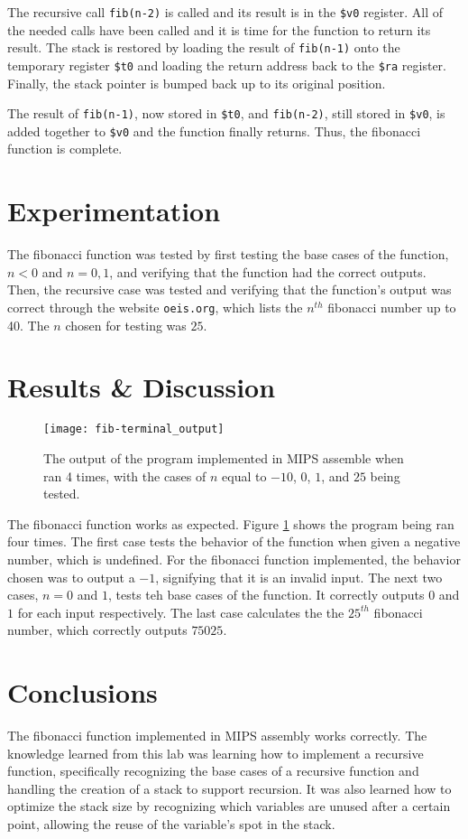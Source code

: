\documentclass[11pt]{report}
\begin{document}
The recursive call \verb|fib(n-2)| is called and its result is in the \verb|$v0| register. All of
the needed calls have been called and it is time for the function to return its result. The stack is
restored by loading the result of \verb|fib(n-1)| onto the temporary register \verb|$t0| and loading
the return address back to the \verb|$ra| register. Finally, the stack pointer is bumped back up to
its original position.

The result of \verb|fib(n-1)|, now stored in \verb|$t0|, and \verb|fib(n-2)|, still stored in
\verb|$v0|, is added together to \verb|$v0| and the function finally returns. Thus, the fibonacci
function is complete.

\section*{Experimentation}
The fibonacci function was tested by first testing the base cases of the function, $n < 0$ and $n =
0, 1$, and verifying that the function had the correct outputs. Then, the recursive case was tested
and verifying that the function's output was correct through the website \verb|oeis.org|, which
lists the $n^{th}$ fibonacci number up to 40. The $n$ chosen for testing was $25$.

\section*{Results \& Discussion}
\begin{figure}[h!]
    \centering
    \texttt{[image: fib-terminal\_output]}
    \caption{
        The output of the program implemented in MIPS assemble when ran 4 times, with the cases of
        $n$ equal to $-10$, $0$, $1$, and $25$ being tested.
    }
    \label{fig:fib-terminal_output}
\end{figure}
The fibonacci function works as expected. Figure \ref{fig:fib-terminal_output} shows the program
being ran four times. The first case tests the behavior of the function when given a negative
number, which is undefined. For the fibonacci function implemented, the behavior chosen was to
output a $-1$, signifying that it is an invalid input. The next two cases, $n = 0$ and $1$, tests
teh base cases of the function. It correctly outputs $0$ and $1$ for each input respectively. The
last case calculates the the $25^{th}$ fibonacci number, which correctly outputs $75025$.

\section*{Conclusions}
The fibonacci function implemented in MIPS assembly works correctly. The knowledge learned from this
lab was learning how to implement a recursive function, specifically recognizing the base cases of a
recursive function and handling the creation of a stack to support recursion. It was also learned
how to optimize the stack size by recognizing which variables are unused after a certain point,
allowing the reuse of the variable's spot in the stack.
\end{document}
